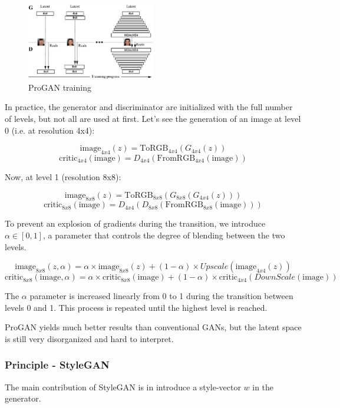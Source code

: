 \documentclass{article}
\begin{document}
\begin{figure}[H]
    \centering
    \includegraphics[width=0.5\textwidth]{images/progan.png}
    \caption{ProGAN training}
\end{figure}

In practice, the generator and discriminator are initialized with the full number of levels, but not all are used at first. Let's see the generation of an image at level 0 (i.e. at resolution 4x4):

\[\text{image}_{4x4}(z) = \text{ToRGB}_{4x4}(G_{4x4}(z))\]
\[\text{critic}_{4x4}(\text{image}) = D_{4x4}(\text{FromRGB}_{4x4}(\text{image}))\]

Now, at level 1 (resolution 8x8):

\[\text{image}_{8x8}(z) = \text{ToRGB}_{8x8}(G_{8x8}(G_{4x4}(z)))\]
\[\text{critic}_{8x8}(\text{image}) = D_{4x4}(D_{8x8}(\text{FromRGB}_{8x8}(\text{image})))\]

To prevent an explosion of gradients during the transition, we introduce $\alpha \in \left[0, 1\right]$, a parameter that controls the degree of blending between the two levels.

\[\text{image}_{8x8}(z, \alpha) = \alpha \times \text{image}_{8x8}(z) + (1-\alpha) \times Upscale(\text{image}_{4x4}(z))\]
\[\text{critic}_{8x8}(\text{image}, \alpha) = \alpha \times \text{critic}_{8x8}(\text{image}) + (1-\alpha) \times \text{critic}_{4x4}(DownScale(\text{image}))\]

The $\alpha$ parameter is increased linearly from 0 to 1 during the transition between levels 0 and 1. This process is repeated until the highest level is reached. 

ProGAN yields much better results than conventional GANs, but the latent space is still very disorganized and hard to interpret.

\subsubsection*{Principle - StyleGAN}

The main contribution of StyleGAN is in introduce a style-vector $w$ in the generator.
\end{document}
